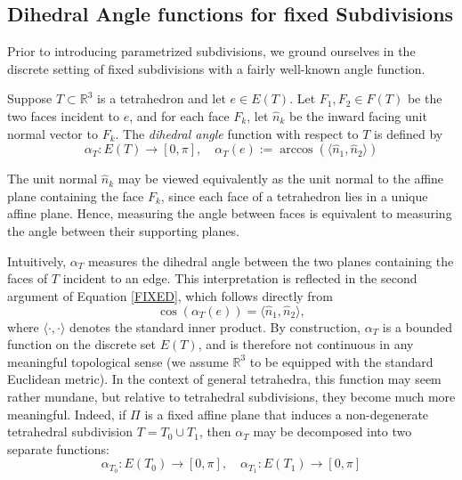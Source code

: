 \documentclass{mainresearch}
\begin{document}
\subsection{Dihedral Angle functions for fixed Subdivisions}
Prior to introducing parametrized subdivisions, we ground ourselves in the discrete setting of fixed subdivisions with a fairly well-known angle function.
\begin{defin}
	Suppose $T\subset \mathbb{R}^3$ is a tetrahedron and let $e \in E(T)$. Let $F_1,F_2 \in F(T)$ be the two faces incident to $e$, and for each face $F_k$, let $\hat{n}_k$ be the inward facing unit normal vector to $F_k$. The \textit{dihedral angle} function with respect to $T$ is defined by 
	\begin{equation}\label{FIXED}
		\alpha_T:E(T) \to [0,\pi], \quad  \alpha_T(e) := \arccos(\langle \hat{n}_1,\hat{n}_2\rangle )
	\end{equation}
\end{defin}
\begin{remark}
	The unit normal $\hat{n}_k$ may be viewed equivalently as the unit normal to the affine plane containing the face $F_k$, since each face of a tetrahedron lies in a unique affine plane. Hence, measuring the angle between faces is equivalent to measuring the angle between their supporting planes.
\end{remark}
Intuitively, $\alpha_T$ measures the dihedral angle between the two planes containing the faces of $T$ incident to an edge. This interpretation is reflected in the second argument of Equation \ref{FIXED}, which follows directly from
\begin{equation}
	\cos(\alpha_T(e)) = \langle \hat{n}_1, \hat{n}_2 \rangle,
\end{equation}
where $\langle \cdot, \cdot \rangle$ denotes the standard inner product. By construction, $\alpha_T$ is a bounded function on the discrete set $E(T)$, and is therefore not continuous in any meaningful topological sense (we assume $\mathbb{R}^3$ to be equipped with the standard Euclidean metric). In the context of general tetrahedra, this function may seem rather mundane, but relative to tetrahedral subdivisions, they become much more meaningful. Indeed, if $\Pi$ is a fixed affine plane that induces a non-degenerate tetrahedral subdivision $T= T_0 \cup T_1$, then $\alpha_T$ may be decomposed into two separate functions:
\begin{equation}\label{A12}
	\alpha_{T_0}:E(T_0) \to [0,\pi], \quad \alpha_{T_1}:E(T_1) \to [0,\pi]
\end{equation}
\end{document}
